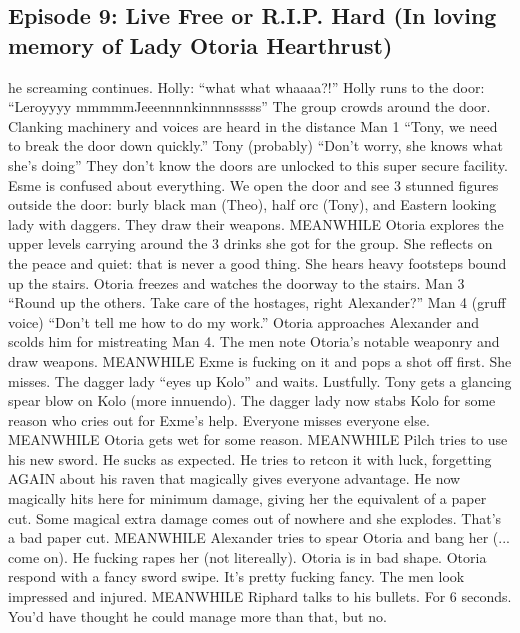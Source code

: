 \subsection{Episode 9: Live Free or R.I.P. Hard (In loving memory of Lady Otoria Hearthrust)}
he screaming continues.\medskip
Holly: “what what whaaaa?!”\medskip
Holly runs to the door: “Leroyyyy mmmmmJeeennnnkinnnnsssss”\medskip
The group crowds around the door. Clanking machinery and voices are heard in the distance\medskip
Man 1 “Tony, we need to break the door down quickly.”\medskip
Tony (probably) “Don’t worry, she knows what she’s doing”\medskip
They don’t know the doors are unlocked to this super secure facility.\medskip
Esme is confused about everything.\medskip
We open the door and see 3 stunned figures outside the door: burly black man (Theo), half orc (Tony), and Eastern looking lady with daggers. They draw their weapons.\medskip
MEANWHILE\medskip
Otoria explores the upper levels carrying around the 3 drinks she got for the group. She reflects on the peace and quiet: that is never a good thing. She hears heavy footsteps bound up the stairs.\medskip
Otoria freezes and watches the doorway to the stairs.\medskip
Man 3 “Round up the others. Take care of the hostages, right Alexander?”\medskip
Man 4 (gruff voice) “Don’t tell me how to do my work.”\medskip
Otoria approaches Alexander and scolds him for mistreating Man 4.\medskip
The men note Otoria’s notable weaponry and draw weapons.\medskip
MEANWHILE\medskip
Exme is fucking on it and pops a shot off first. She misses.\medskip
The dagger lady “eyes up Kolo” and waits. Lustfully.\medskip
Tony gets a glancing spear blow on Kolo (more innuendo).\medskip
The dagger lady now stabs Kolo for some reason who cries out for Exme’s help.\medskip
Everyone misses everyone else.\medskip
MEANWHILE\medskip
Otoria gets wet for some reason.\medskip
MEANWHILE\medskip
Pilch tries to use his new sword. He sucks as expected. He tries to retcon it with luck, forgetting AGAIN about his raven that magically gives everyone advantage. He now magically hits here for minimum damage, giving her the equivalent of a paper cut. Some magical extra damage comes out of nowhere and she explodes. That’s a bad paper cut.\medskip
MEANWHILE\medskip
Alexander tries to spear Otoria and bang her (... come on). He fucking rapes her (not litereally). Otoria is in bad shape.\medskip
Otoria respond with a fancy sword swipe. It’s pretty fucking fancy. The men look impressed and injured.\medskip
MEANWHILE\medskip
Riphard talks to his bullets. For 6 seconds. You’d have thought he could manage more than that, but no.\medskip
